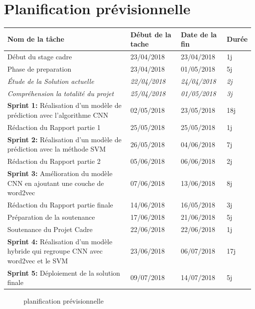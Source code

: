 \section{Planification prévisionnelle}
\begin{tabular}{|p{6cm}|p{3cm}|p{3cm}|p{2cm}|}
\hline
\textbf{Nom de la tâche} & \textbf{Début de la tache} & \textbf{Date de la fin} & \textbf{Durée} \\
\hline
 Début du stage cadre & 23/04/2018 & 23/04/2018 & 1j\\
\hline
 Phase de preparation & 23/04/2018 & 01/05/2018 & 5j\\
\hline 
\textit{\hspace{1cm}Étude de la Solution actuelle} & \textit{22/04/2018} &  \textit{24/04/2018} & \textit{2j}\\
\hline
\textit{\hspace{1cm}Compréhension la totalité du projet} & \textit{25/04/2018} & \textit{01/05/2018} &  \textit{3j}\\
\hline
\textbf{Sprint 1: }Réalisation d'un modèle de prédiction avec l'algorithme CNN & 02/05/2018 & 23/05/2018 & 18j\\
\hline
Rédaction du Rapport partie 1 & 25/05/2018 & 25/05/2018 & 1j \\
\hline
\textbf{Sprint 2: }Réalisation d'un modèle de prédiction avec la méthode SVM & 26/05/2018 & 04/06/2018 & 7j\\
\hline
Rédaction du Rapport partie 2 & 05/06/2018 & 06/06/2018 & 2j \\
\hline
\textbf{Sprint 3: }Amélioration du modèle CNN en ajoutant une couche de word2vec & 07/06/2018 & 13/06/2018 & 8j\\
\hline
Rédaction du Rapport partie finale & 14/06/2018 & 16/05/2018 & 3j \\
\hline
Préparation de la soutenance & 17/06/2018 & 21/06/2018 & 5j \\
\hline 
Soutenance du Projet Cadre & 22/06/2018 & 22/06/2018 & 1j\\
\hline
\textbf{Sprint 4: }Réalisation d'un modèle hybride qui regroupe CNN avec word2vec et le SVM & 23/06/2018 & 06/07/2018 & 17j\\
\hline
\textbf{Sprint 5: }Déploiement de la solution finale & 09/07/2018 & 14/07/2018 & 5j\\
\hline
\end{tabular}
\begin{figure}[h]
  \caption{planification prévisionnelle}
  \label{fig:planification}
\end{figure}
